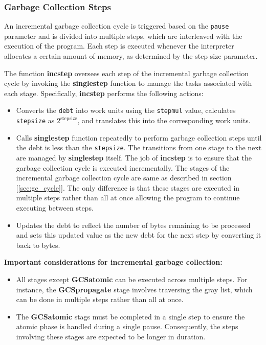 \documentclass[10pt]{article}
\begin{document}
\subsubsection{Garbage Collection Steps}
An incremental garbage collection cycle is triggered based on the \texttt{pause} parameter and is divided into multiple steps, which are interleaved with the execution of the program. Each step is executed whenever the interpreter allocates a certain amount of memory, as determined by the step size parameter.

The function \textbf{incstep} oversees each step of the incremental garbage collection cycle by invoking the \textbf{singlestep} function to manage the tasks associated with each stage. Specifically, \textbf{incstep} performs the following actions:

\begin{itemize}
  \item Converts the \texttt{debt} into work units using the \texttt{stepmul} value, calculates \texttt{stepsize} as \(2^{\text{stepsize}}\), and translates this into the corresponding work units.
  \item Calls \textbf{singlestep} function repeatedly to perform garbage collection steps until the debt is less than the \texttt{stepsize}. The transitions from one stage to the next are managed by \textbf{singlestep} itself. The job of \textbf{incstep} is to ensure that the garbage collection cycle is executed incrementally. The stages of the incremental garbage collection cycle are same as described in section [\ref{sec:gc_cycle}]. The only difference is that these stages are executed in multiple steps rather than all at once allowing the program to continue executing between steps.
  \item Updates the debt to reflect the number of bytes remaining to be processed and sets this updated value as the new debt for the next step by converting it back to bytes.
\end{itemize}


\textbf{Important considerations for incremental garbage collection:}

\begin{itemize}
  \item All stages except \textbf{GCSatomic} can be executed across multiple steps. For instance, the \textbf{GCSpropagate} stage involves traversing the gray list, which can be done in multiple steps rather than all at once.
  \item The \textbf{GCSatomic} stags must be completed in a single step to ensure the atomic phase is handled during a single pause. Consequently, the steps involving these stages are expected to be longer in duration.
\end{itemize}
\end{document}
